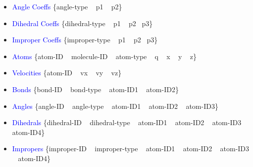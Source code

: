 {\begin{itemize}
		\{\textrm{bond-type ~ p1 ~ p2}\}
			\vskip 8pt
		\item \textcolor{blue}{\textrm{Angle Coeffs}}
			\vskip 2pt
		\{\textrm{angle-type ~ p1 ~ p2}\}
			\vskip 8pt
		\item \textcolor{blue}{\textrm{Dihedral Coeffs}}
			\vskip 2pt
		\{\textrm{dihedral-type ~ p1 ~ p2 ~p3}\}
			\vskip 8pt
		\item \textcolor{blue}{\textrm{Improper Coeffs}}
			\vskip 2pt
		\{\textrm{improper-type ~ p1 ~ p2 ~p3}\}
			\vskip 8pt
		\item \textcolor{blue}{\textrm{Atoms}}
			\vskip 2pt
	 	\{\textrm{atom-ID ~ molecule-ID ~ atom-type ~ q ~ x ~ y ~ z}\}
			\vskip 8pt
		\item \textcolor{blue}{\textrm{Velocities}}
			\vskip 2pt
		\{\textrm{atom-ID ~ vx ~ vy ~ vz}\}
			\vskip 8pt
		\item \textcolor{blue}{\textrm{Bonds}}
			\vskip 2pt
		\{\textrm{bond-ID ~ bond-type ~ atom-ID1 ~ atom-ID2}\}
			\vskip 8pt
		\item \textcolor{blue}{\textrm{Angles}}
			\vskip 2pt
		\{\textrm{angle-ID ~ angle-type ~ atom-ID1 ~ atom-ID2 ~ atom-ID3}\}
			\vskip 8pt
		\item \textcolor{blue}{\textrm{Dihedrals}}
			\vskip 2pt
		\{\textrm{dihedral-ID ~ dihedral-type ~ atom-ID1 ~ atom-ID2 ~ atom-ID3 ~ atom-ID4}\}
			\vskip 8pt
		\item \textcolor{blue}{\textrm{Impropers}}
			\vskip 2pt
		\{\textrm{improper-ID ~ improper-type ~ atom-ID1 ~ atom-ID2 ~ atom-ID3 ~ atom-ID4}\}
	\end{itemize}
}

